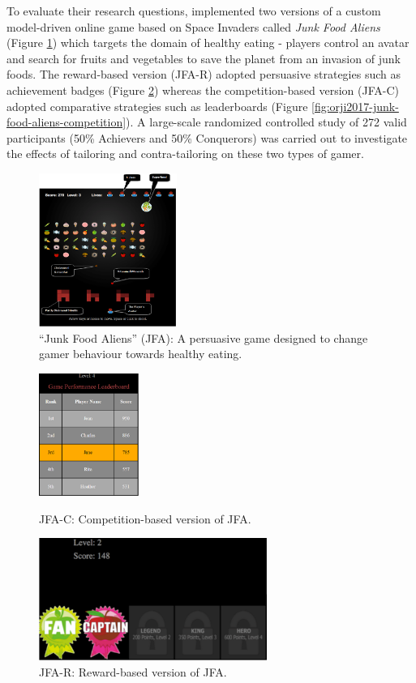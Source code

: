 \documentclass[11pt]{article}
\begin{document}
To evaluate their research questions, \citeauthor{orji2017} implemented two versions of a custom model-driven online game based on Space Invaders called \textit{Junk Food Aliens} (Figure \ref{fig:orji2017-junk-food-aliens}) which targets the domain of healthy eating - players control an avatar and search for fruits and vegetables to save the planet from an invasion of junk foods. The reward-based version (JFA-R) adopted persuasive strategies such as achievement badges (Figure \ref{fig:orji2017-junk-food-aliens-reward}) whereas the competition-based version (JFA-C) adopted comparative strategies such as leaderboards (Figure \ref{fig:orji2017-junk-food-aliens-competition}). A large-scale randomized controlled study of 272 valid participants (50\% Achievers and 50\% Conquerors) was carried out to investigate the effects of tailoring and contra-tailoring on these two types of gamer. 

\begin{figure}[H]
\centering
\includegraphics[width=0.4\textwidth]{img/orji2017-junk-food-aliens.png} 
\caption{``Junk Food Aliens'' (JFA): A persuasive game designed to change gamer behaviour towards healthy eating.}\label{fig:orji2017-junk-food-aliens}
\end{figure}

\begin{figure}[H]
\centering
  \includegraphics[height=4cm]{img/orji2017-junk-food-aliens-competition.png}
  \caption{JFA-C: Competition-based version of JFA.}\label{fig:orji2017-junk-food-aliens-competition}
\endminipage\hfill
{}%
\centering
  \includegraphics[height=4cm]{img/orji2017-junk-food-aliens-reward.png}
  \caption{JFA-R: Reward-based version of JFA.}\label{fig:orji2017-junk-food-aliens-reward}
\endminipage
\end{figure}
\end{document}

